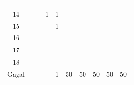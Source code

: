 \begin{minipage}[\minipagealign]{\minipagewidth}
{\begin{tabular}{|c|lllllllll|}
\multicolumn{1}{r|}{} & \\ \hline 14 & \multicolumn{1}{r|}{} & \multicolumn{1}{r|}{} & \multicolumn{1}{r|}{1} & \multicolumn{1}{r|}{1} & \multicolumn{1}{r|}{} & \multicolumn{1}{r|}{} & \multicolumn{1}{r|}{} & \multicolumn{1}{r|}{} & \\ \hline 15 & \multicolumn{1}{r|}{} & \multicolumn{1}{r|}{} & \multicolumn{1}{r|}{} & \multicolumn{1}{r|}{1} & \multicolumn{1}{r|}{} & \multicolumn{1}{r|}{} & \multicolumn{1}{r|}{} & \multicolumn{1}{r|}{} & \\ \hline 16 & \multicolumn{1}{r|}{} & \multicolumn{1}{r|}{} & \multicolumn{1}{r|}{} & \multicolumn{1}{r|}{} & \multicolumn{1}{r|}{} & \multicolumn{1}{r|}{} & \multicolumn{1}{r|}{} & \multicolumn{1}{r|}{} & \\ \hline 17 & \multicolumn{1}{r|}{} & \multicolumn{1}{r|}{} & \multicolumn{1}{r|}{} & \multicolumn{1}{r|}{} & \multicolumn{1}{r|}{} & \multicolumn{1}{r|}{} & \multicolumn{1}{r|}{} & \multicolumn{1}{r|}{} & \\ \hline 18 & \multicolumn{1}{r|}{} & \multicolumn{1}{r|}{} & \multicolumn{1}{r|}{} & \multicolumn{1}{r|}{} & \multicolumn{1}{r|}{} & \multicolumn{1}{r|}{} & \multicolumn{1}{r|}{} & \multicolumn{1}{r|}{} & \\ \hline Gagal & \multicolumn{1}{r|}{} & \multicolumn{1}{r|}{} & \multicolumn{1}{r|}{} & \multicolumn{1}{r|}{1} & \multicolumn{1}{r|}{50} & \multicolumn{1}{r|}{50} & \multicolumn{1}{r|}{50} & \multicolumn{1}{r|}{50} & 50 \\ \hline
		\end{tabular}
	}
	\label{tab:freq-emd-large-bs}
\end{minipage}
